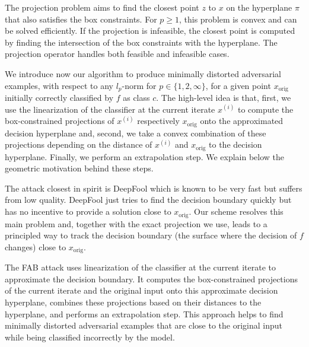 The projection problem aims to find the closest point $z$ to $x$ on the hyperplane $\pi$ that also satisfies the box constraints. For $p \geq 1$, this problem is convex and can be solved efficiently. If the projection is infeasible, the closest point is computed by finding the intersection of the box constraints with the hyperplane. The projection operator handles both feasible and infeasible cases.

We introduce now our algorithm to produce minimally distorted adversarial examples, with respect to any $l_p$-norm for $p \in \{1, 2, \infty \}$, for a given point $x_{\text{orig}}$ initially correctly classified by $f$ as class $c$. The high-level idea is that, first, we use the linearization of the classifier at the current iterate $x^{(i)}$ to compute the box-constrained projections of $x^{(i)}$ respectively $x_{\text{orig}}$ onto the approximated decision hyperplane and, second, we take a convex combination of these projections depending on the distance of $x^{(i)}$ and $x_{\text{orig}}$ to the decision hyperplane. Finally, we perform an extrapolation step. We explain below the geometric motivation behind these steps.

The attack closest in spirit is DeepFool which is known to be very fast but suffers from low quality. DeepFool just tries to find the decision boundary quickly but has no incentive to provide a solution close to $x_{\text{orig}}$. Our scheme resolves this main problem and, together with the exact projection we use, leads to a principled way to track the decision boundary (the surface where the decision of $f$ changes) close to $x_{\text{orig}}$.

The FAB attack uses linearization of the classifier at the current iterate to approximate the decision boundary. It computes the box-constrained projections of the current iterate and the original input onto this approximate decision hyperplane, combines these projections based on their distances to the hyperplane, and performs an extrapolation step. This approach helps to find minimally distorted adversarial examples that are close to the original input while being classified incorrectly by the model.
